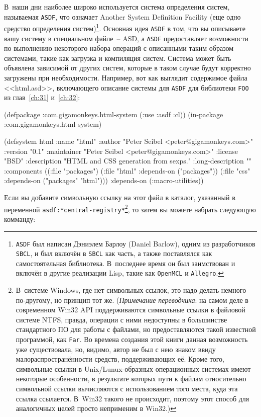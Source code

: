 В~наши дни наиболее широко используется система определения систем, называемая
\lstinline{ASDF}, что означает Another System Definition Facility (еще одно средство
определения систем)\footnote{\lstinline{ASDF} был написан Дэниэлем Барлоу (Daniel Barlow),
  одним из разработчиков \lstinline{SBCL}, и был включён в \lstinline{SBCL} как часть, а
  также поставлялся как самостоятельная библиотека. В~последнее время он был заимствован и
  включён в другие реализации Lisp, такие как \lstinline{OpenMCL} и
  \lstinline{Allegro}.}\hspace{\footnotenegspace}. Основная идея \lstinline{ASDF} в том, что вы описываете вашу
систему в специальном файле~-- ASD, а \lstinline{ASDF} предоставляет возможности по
выполнению некоторого набора операций с описанными таким образом системами, такие как
загрузка и компиляция систем. Система может быть объявлена зависимой от других систем,
которые в таком случае будут корректно загружены при необходимости. Например, вот как
выглядит содержимое файла <<html.asd>>, включающего описание системы для \lstinline{ASDF}
для библиотеки \lstinline{FOO} из глав~\ref{ch:31} и~\ref{ch:32}:

\begin{myverb}
(defpackage :com.gigamonkeys.html-system (:use :asdf :cl))
(in-package :com.gigamonkeys.html-system)

(defsystem html
  :name "html"
  :author "Peter Seibel <peter@gigamonkeys.com>"
  :version "0.1"
  :maintainer "Peter Seibel <peter@gigamonkeys.com>"
  :license "BSD"
  :description "HTML and CSS generation from sexps."
  :long-description ""
  :components
  ((:file "packages")
   (:file "html" :depends-on ("packages"))
   (:file "css" :depends-on ("packages" "html")))
  :depends-on (:macro-utilities))
\end{myverb}

Если вы добавите символьную ссылку на этот файл в каталог, указанный в переменной
\lstinline{asdf:*central-registry*}\footnote{В~системе Windows, где нет символьных ссылок, это
  надо делать немного по-другому, но принцип тот же. (\emph{Примечание переводчика}: на самом
  деле в современном Win32 API поддерживаются символьные ссылки в файловой системе NTFS,
  правда, операции с ними недоступны в большинстве стандартного ПО для работы с файлами, но
  предоставляются такой известной программой, как \lstinline{Far}. Во времена создания этой
  книги данная возможность уже существовала, но, видимо, автор не был с нею знаком ввиду
  малораспространённости средств, поддерживающих её. Кроме того, символьные ссылки в
  Unix/Lunux-образных операционных системах имеют некоторые особенности, в результате
  которых пути к файлам относительно символьной ссылки вычисляются с использованием того
  места, куда эта ссылка ссылается. В~Win32 такого не происходит, поэтому этот способ для
  аналогичных целей просто неприменим в Win32.)}\hspace{\footnotenegspace}, то затем вы можете набрать следующую
комманду:

